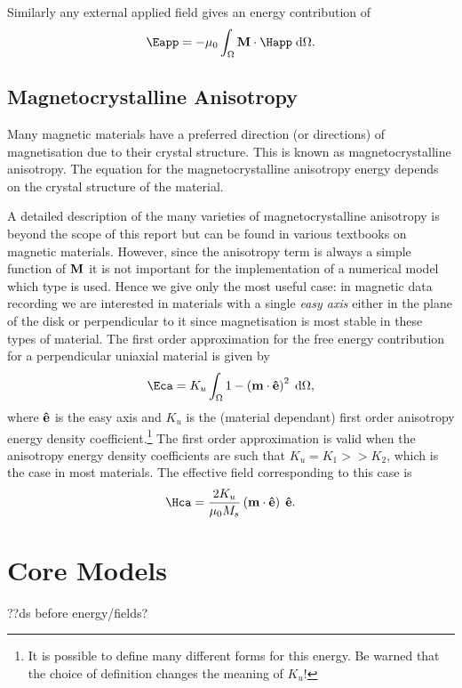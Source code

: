 Similarly any external applied field gives an energy contribution of
\begin{equation}
  \label{eq:42}
  \Eapp = - \mu_0 \int_{\magd} \Mv \cdot \Happ \d \magd.
\end{equation}

\subsection{Magnetocrystalline Anisotropy}
\label{sec:magn-anis}

Many magnetic materials have a preferred direction (or directions) of magnetisation due to their crystal structure. This is known as magnetocrystalline anisotropy. The equation for the magnetocrystalline anisotropy energy depends on the crystal structure of the material.

A detailed description of the many varieties of magnetocrystalline anisotropy is beyond the scope of this report but can be found in various textbooks on magnetic materials.\cite{Coey2010}\cite{Aharoni1996} However, since the anisotropy term is always a simple function of $\mathbf{M}$ it is not important for the implementation of a numerical model which type is used. Hence we give only the most useful case: in magnetic data recording we are interested in materials with a single \emph{easy axis} either in the plane of the disk or perpendicular to it since magnetisation is most stable in these types of material. The first order approximation for the free energy contribution for a perpendicular uniaxial material is given by
\begin{equation}
  \Eca = K_u \int_\magd 1 - \left( \mv \cdot \ev \right)^2 \d \magd,
  \label{eq:36}
\end{equation}
where $\mathbf{\hat{e}}$ is the easy axis and $K_u$ is the (material dependant) first order anisotropy energy density coefficient.\footnote{It is possible to define many different forms for this energy. Be warned that the choice of definition changes the meaning of $K_u$!} The first order approximation is valid when the anisotropy energy density coefficients are such that $K_u = K_1 >> K_2$, which is the case in most materials.\cite{Kronmuller2003} The effective field corresponding to this case is
\begin{equation}
  \Hca = \frac{2 K_u}{\mu_0 M_s} \left( \mv \cdot \ev \right) \; \ev.
  \label{eq:Hca}
\end{equation}


\section{Core Models}
??ds before energy/fields?

